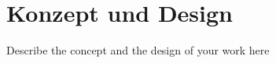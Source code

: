 \chapter{Konzept und Design}
\label{cha:konzeption}

Describe the concept and the design of your work here